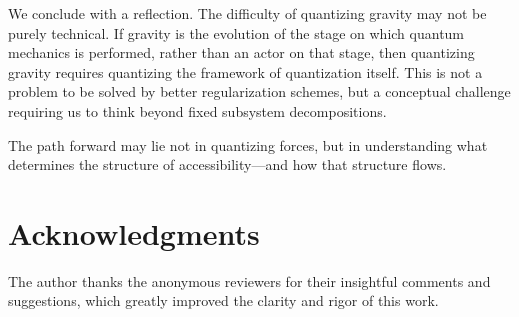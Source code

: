 \documentclass[12pt,a4paper]{article}
\begin{document}
We conclude with a reflection. The difficulty of quantizing gravity may not be purely technical. If gravity is the evolution of the stage on which quantum mechanics is performed, rather than an actor on that stage, then quantizing gravity requires quantizing the framework of quantization itself. This is not a problem to be solved by better regularization schemes, but a conceptual challenge requiring us to think beyond fixed subsystem decompositions.

The path forward may lie not in quantizing forces, but in understanding what determines the structure of accessibility—and how that structure flows.

\section*{Acknowledgments}

The author thanks the anonymous reviewers for their insightful comments and suggestions, which greatly improved the clarity and rigor of this work.
\end{document}
